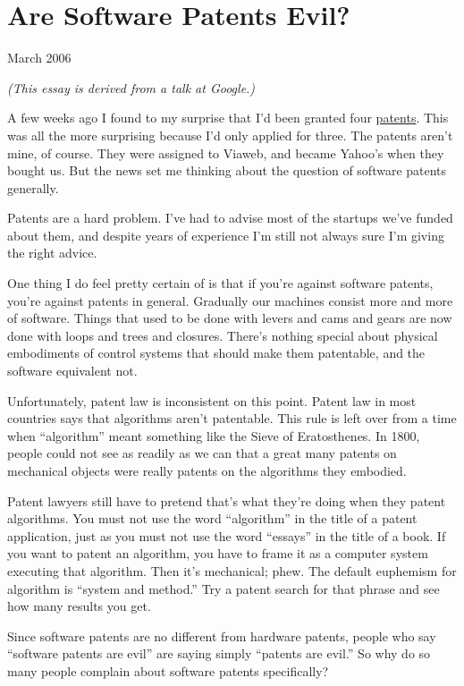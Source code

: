 \chapter{Are Software Patents Evil?}

March 2006

\emph{(This essay is derived from a talk at Google.)}

A few weeks ago I found to my surprise that I'd been granted four
\href{http://paulgraham.infogami.com/blog/morepatents}{patents}. This
was all the more surprising because I'd only applied for three. The
patents aren't mine, of course. They were assigned to Viaweb, and became
Yahoo's when they bought us. But the news set me thinking about the
question of software patents generally.

Patents are a hard problem. I've had to advise most of the startups
we've funded about them, and despite years of experience I'm still not
always sure I'm giving the right advice.

One thing I do feel pretty certain of is that if you're against software
patents, you're against patents in general. Gradually our machines
consist more and more of software. Things that used to be done with
levers and cams and gears are now done with loops and trees and
closures. There's nothing special about physical embodiments of control
systems that should make them patentable, and the software equivalent
not.

Unfortunately, patent law is inconsistent on this point. Patent law in
most countries says that algorithms aren't patentable. This rule is left
over from a time when ``algorithm'' meant something like the Sieve of
Eratosthenes. In 1800, people could not see as readily as we can that a
great many patents on mechanical objects were really patents on the
algorithms they embodied.

Patent lawyers still have to pretend that's what they're doing when they
patent algorithms. You must not use the word ``algorithm'' in the title
of a patent application, just as you must not use the word ``essays'' in
the title of a book. If you want to patent an algorithm, you have to
frame it as a computer system executing that algorithm. Then it's
mechanical; phew. The default euphemism for algorithm is ``system and
method.'' Try a patent search for that phrase and see how many results
you get.

Since software patents are no different from hardware patents, people
who say ``software patents are evil'' are saying simply ``patents are
evil.'' So why do so many people complain about software patents
specifically?

